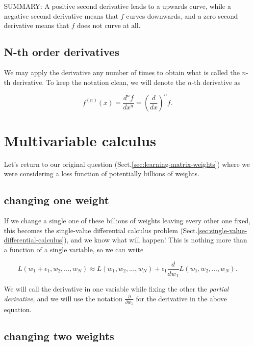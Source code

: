 SUMMARY: A positive second derivative leads to a upwards curve, while a negative second
derivative means that $f$ curves downwards, and a zero second derivative means
that $f$ does not curve at all.


\subsection{N-th order derivatives}

We may apply the derivative any number of times to obtain what is called the
$n$-th derivative. To keep the notation clean, we will denote the $n$-th
derivative as

\begin{equation}
f^{(n)}(x) = \frac{d^{n}f}{dx^{n}} = \left(\frac{d}{dx}\right)^{n} f.
\end{equation}


\section{Multivariable calculus}
\label{sec:multivariable-differential-calculus}

Let's return to our original question (Sect.\ref{sec:learning-matrix-weights})
where we were considering a loss function of potentially billions of weights.

\subsection{changing one weight}

If we change a single one of these billions of weights leaving every other one
fixed, this becomes the single-value differential calculus problem
(Sect.\ref{sec:single-value-differential-calculus}), and we know what will
happen! This is nothing more than a function of a single variable, so we can
write

\begin{equation}
L(w_1+\epsilon_1, w_2, \ldots, w_N) \approx L(w_1, w_2, \ldots, w_N) + \epsilon_1 \frac{d}{dw_1} L(w_1, w_2, \ldots, w_N).
\end{equation}

We will call the derivative in one variable while fixing the other the {\it partial
derivative}, and we will use the notation $\frac{\partial}{\partial w_1}$ for
the derivative in the above equation.

\subsection{changing two weights}

